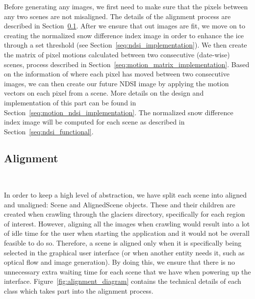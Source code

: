 \documentclass[12pt, a4paper]{report}
\begin{document}
	\par Before generating any images, we first need to make sure that the pixels between any two scenes are not misaligned. The details of the alignment process are described in Section~\ref{seq:alignment_implementation}. After we ensure that out images are fit, we move on to creating the normalized snow difference index image in order to enhance the ice through a set threshold (see Section~\ref{seq:ndsi_implementation}). We then create the matrix of pixel motions calculated between two consecutive (date-wise) scenes, process described in Section~\ref{seq:motion_matrix_implementation}. Based on the information of where each pixel has moved between two consecutive images, we can then create our future NDSI image by applying the motion vectors on each pixel from a scene. More details on the design and implementation of this part can be found in Section~\ref{seq:motion_ndsi_implementation}.
	The normalized snow difference index image will be computed for each scene as described in Section~\ref{seq:ndsi_functional}.
	
	
	\subsection{Alignment}
	\label{seq:alignment_implementation}\
	
	\par In order to keep a high level of abstraction, we have split each scene into aligned and unaligned: Scene and AlignedScene objects. These and their children are created when crawling through the glaciers directory, specifically for each region of interest. However, aligning all the images when crawling would result into a lot of idle time for the user when starting the application and it would not be overall feasible to do so. Therefore, a scene is aligned only when it is specifically being selected in the graphical user interface (or when another entity needs it, such as optical flow and image generation). By doing this, we ensure that there is no unnecessary extra waiting time for each scene that we have when powering up the interface. Figure~\ref{fig:alignment_diagram} contains the technical details of each class which takes part into the alignment process.
	
\end{document}
